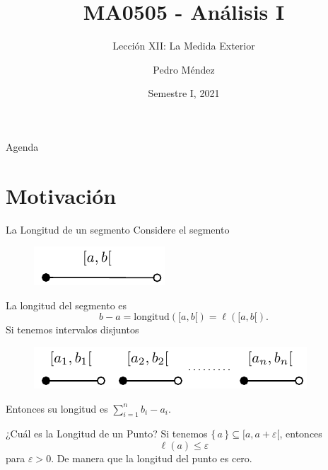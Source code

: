 \documentclass[utf8]{beamer}
\title[MA0505]{MA0505 - An\'alisis I}
\subtitle{Lecci\'on XII: La Medida Exterior}
\author{Pedro M\'endez\inst{1}}
\institute[Universidad de Costa Rica] %
{
  \inst{1}%
  Departmento de Matem\'atica Pura y Ciencias Actuariales\\
  Universidad de Costa Rica
  }
\date[I-2021] {Semestre I, 2021}
\theoremstyle{plain}
\theoremstyle{definition}
\theoremstyle{remark}
\numberwithin{equation}{section}
\newcommand{\eps}{\varepsilon}          %
\newcommand{\set}[1]{\{\,#1\,\}}    %
\renewcommand{\l}{\ell}                   %
\renewcommand{\leq}{\leqslant}          %
\renewcommand{\.}{\Cdot}                %
\begin{document}
\begin{frame}
  \titlepage
\end{frame}

\begin{frame}{Agenda}
  \tableofcontents
\end{frame}





\section{Motivación}

\begin{frame}{La Longitud de un segmento}
  Considere el segmento 
  \begin{figure}
    \includegraphics{figs/1/fig1.pdf}
  \end{figure}
  La longitud del segmento es 
  $$b-a=\text{longitud}([a,b[)=\l([a,b[).$$
  Si tenemos intervalos disjuntos
  \begin{figure}
    \includegraphics{figs/2/fig2.pdf}
  \end{figure}
  Entonces su longitud es $\sum_{i=1}^nb_i-a_i$.
\end{frame}

\begin{frame}{¿Cuál es la Longitud de un Punto?}
  Si tenemos $\set{a}\subseteq[a,a+\eps[$, entonces 
  $$\l(a)\leq \eps$$
  para $\eps>0$. De manera que la longitud del punto es cero.
\end{frame}
\end{document}
